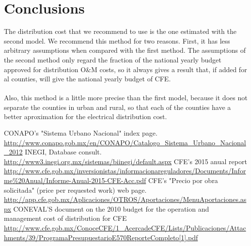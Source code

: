 \documentclass[•]{article}
\begin{document}
\section{Conclusions}
The distribution cost that we recommend to use is the one estimated with the second model. We recommend this method for two reasons. First, it has less arbitrary assumptions when compared with the first method. The assumptions of the second method only regard the fraction of the national yearly budget approved for distribution O\&M costs, so it always gives a result that, if added for al counties, will give the national yearly budget of CFE.
\\
\\Also, this method is a little more precise than the first model, because it does not separate the counties in urban and rural, so that each of the counties have a better aproximation for the electrical distribution cost.
\begin{thebibliography}{9}

CONAPO's "Sistema Urbano Nacional" index page. \url{http://www.conapo.gob.mx/en/CONAPO/Catalogo_Sistema_Urbano_Nacional_2012}
INEGI, Database consult. \url{http://www3.inegi.org.mx/sistemas/biinegi/default.aspx}
CFE's 2015 anual report \url{http://www.cfe.gob.mx/inversionistas/informacionareguladores/Documents/Informe%20Anual/Informe-Anual-2015-CFE-Acc.pdf}
CFE's "Precio por obra solicitada" (price per requested work) web page. \url{http://app.cfe.gob.mx/Aplicaciones/OTROS/Aportaciones/MenuAportaciones.aspx}
CONEVAL'S document on the 2010 budget for the operation and management cost of distribution for CFE \url{http://www.cfe.gob.mx/ConoceCFE/1_AcercadeCFE/Lists/Publicaciones/Attachments/39/ProgramaPresupuestarioE570ReporteCompleto[1].pdf}
\end{thebibliography}
\end{document}
